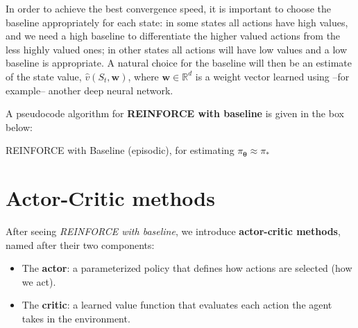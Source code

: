 In order to achieve the best convergence speed, it is important to choose the baseline appropriately for each state: in some states all actions have high values, and we need a high baseline to differentiate the higher valued actions from the less highly valued ones; in other states all actions will have low values and a low baseline is appropriate. A natural choice for the baseline will then be an estimate of the state value,  $\hat{v}(S_t,\boldsymbol{w})$, where $\boldsymbol{w} \in \mathbb{R}^d$ is a weight vector learned using --for example-- another deep neural network.

A pseudocode algorithm for \textbf{REINFORCE with baseline} is given in the box below:

\begin{algorithm}[H]
\DontPrintSemicolon
\SetAlgoVlined
{}

\caption{REINFORCE with Baseline (episodic), for estimating $\pi_{\boldsymbol{\theta}} \approx \pi_*$}
\end{algorithm}

\section{Actor-Critic methods}
After seeing \textit{REINFORCE with baseline}, we introduce \textbf{actor-critic methods}, named after their two components:

\begin{itemize}
    \item The \textbf{actor}: a parameterized policy that defines how actions are selected (how we act).
    \item The \textbf{critic}: a learned value function that evaluates each action the agent takes in the environment.
\end{itemize}

